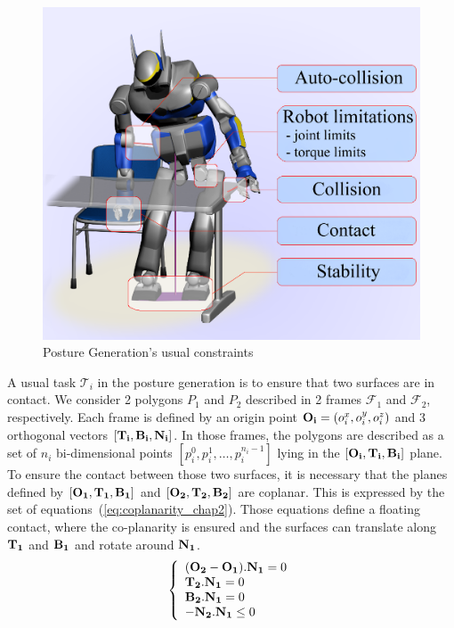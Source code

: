 \begin{figure}[!htb]
  \centering
  \includegraphics[width=.5\linewidth]{PG.png}
  \caption{Posture Generation's usual constraints}
\label{fig:PG}
\end{figure}

A usual task $\mathcal{T}_i$ in the posture generation is to ensure that two surfaces are in contact.
We consider 2 polygons $P_1$ and $P_2$ described in 2 frames $\mathcal{F}_1$ and $\mathcal{F}_2$, respectively.
Each frame is defined by an origin point ${\bf O_i} = (o_i^x, o_i^y, o_i^z)$ and 3 orthogonal vectors $[{\bf T_i, B_i, N_i}]$.
In those frames, the polygons are described as a set of $n_i$ bi-dimensional points $[p_i^0, p_i^1,\ldots, p_i^{n_i-1}]$ lying in the $[{\bf O_i, T_i, B_i}]$ plane.
To ensure the contact between those two surfaces, it is necessary that the planes defined by $[{\bf O_1, T_1, B_1}]$ and $[{\bf O_2, T_2, B_2}]$ are coplanar.
This is expressed by the set of equations~(\ref{eq:coplanarity_chap2}).
Those equations define a floating contact, where the co-planarity is ensured and the surfaces can translate along $\bf T_1$ and $\bf B_1$ and rotate around $\bf N_1$.
\begin{equation}
\left\{
\begin{array}{lr}
{\bf (O_2-O_1).N_1} = 0 \\
{\bf T_2.N_1} = 0 \\
{\bf B_2.N_1} = 0 \\
{\bf -N_2.N_1} \le 0
\end{array}
\right.
\label{eq:coplanarity_chap2}
\end{equation}


